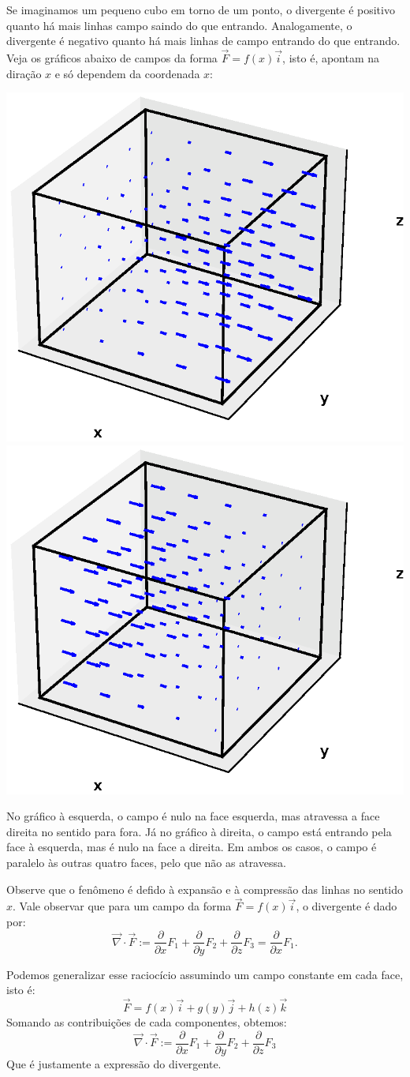 Se imaginamos um pequeno cubo em torno de um ponto, o divergente é positivo quanto há mais linhas campo saindo do que entrando. Analogamente, o divergente é negativo quanto há mais linhas de campo entrando do que entrando. Veja os gráficos abaixo de campos da forma $\vec{F}=f(x)\vec{i}$, isto é, apontam na diração $x$ e só dependem da coordenada $x$:

\includegraphics[width=.5\textwidth]{cap_campos/figs/campo_com_cubo_divergente_positivo}\includegraphics[width=.5\textwidth]{cap_campos/figs/campo_com_cubo_divergente_negativo}  

No gráfico à esquerda, o campo é nulo na face esquerda, mas atravessa a face direita no sentido para fora. Já no gráfico à direita, o campo está entrando pela face à esquerda, mas é nulo na face a direita. Em ambos os casos, o campo é paralelo às outras quatro faces, pelo que não as atravessa.

Observe que o fenômeno é defido à expansão e à compressão das linhas no sentido $x$. Vale observar que para um campo da forma $\vec{F}=f(x)\vec{i}$, o divergente é dado por:
$$\vec{\nabla}\cdot \vec{F} := \frac{\partial}{\partial x} F_1+ \frac{\partial}{\partial y} F_2+\frac{\partial}{\partial z} F_3 =\frac{\partial}{\partial x} F_1.$$

Podemos generalizar esse raciocício assumindo um campo constante em cada face, isto é:
$$\vec{F} = f(x)\vec{i} + g(y)\vec{j} + h(z)\vec{k}$$
Somando as contribuições de cada  componentes, obtemos:
$$\vec{\nabla}\cdot \vec{F} := \frac{\partial}{\partial x} F_1+ \frac{\partial}{\partial y} F_2+\frac{\partial}{\partial z} F_3$$
Que é justamente a expressão do divergente.

